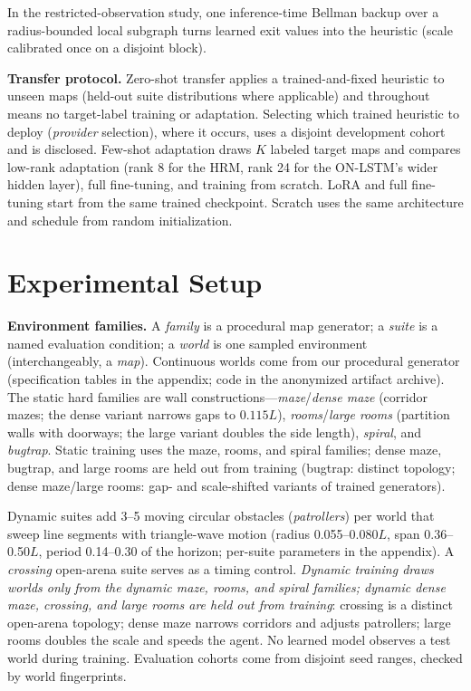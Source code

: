 \documentclass[letterpaper]{article} %
\begin{document}
In the restricted-observation study, one inference-time Bellman backup over a radius-bounded local subgraph turns learned exit values into the heuristic (scale calibrated once on a disjoint block).

\textbf{Transfer protocol.} Zero-shot transfer applies a trained-and-fixed heuristic to unseen maps (held-out suite distributions where applicable) and throughout means no target-label training or adaptation. Selecting which trained heuristic to deploy (\emph{provider} selection), where it occurs, uses a disjoint development cohort and is disclosed. Few-shot adaptation draws $K$ labeled target maps and compares low-rank adaptation \citep[LoRA;][]{hu2021lora} (rank 8 for the HRM, rank 24 for the ON-LSTM's wider hidden layer), full fine-tuning, and training from scratch. LoRA and full fine-tuning start from the same trained checkpoint. Scratch uses the same architecture and schedule from random initialization.

\section{Experimental Setup}

\textbf{Environment families.} A \emph{family} is a procedural map generator; a \emph{suite} is a named evaluation condition; a \emph{world} is one sampled environment (interchangeably, a \emph{map}). Continuous worlds come from our procedural generator (specification tables in the appendix; code in the anonymized artifact archive). The static hard families are wall constructions---\emph{maze}/\emph{dense maze} (corridor mazes; the dense variant narrows gaps to $0.115L$), \emph{rooms}/\emph{large rooms} (partition walls with doorways; the large variant doubles the side length), \emph{spiral}, and \emph{bugtrap}. Static training uses the maze, rooms, and spiral families; dense maze, bugtrap, and large rooms are held out from training (bugtrap: distinct topology; dense maze/large rooms: gap- and scale-shifted variants of trained generators).

Dynamic suites add 3--5 moving circular obstacles (\emph{patrollers}) per world that sweep line segments with triangle-wave motion (radius 0.055--0.080$L$, span 0.36--0.50$L$, period 0.14--0.30 of the horizon; per-suite parameters in the appendix). A \emph{crossing} open-arena suite serves as a timing control. \emph{Dynamic training draws worlds only from the dynamic maze, rooms, and spiral families; dynamic dense maze, crossing, and large rooms are held out from training}: crossing is a distinct open-arena topology; dense maze narrows corridors and adjusts patrollers; large rooms doubles the scale and speeds the agent. No learned model observes a test world during training. Evaluation cohorts come from disjoint seed ranges, checked by world fingerprints.
\end{document}
